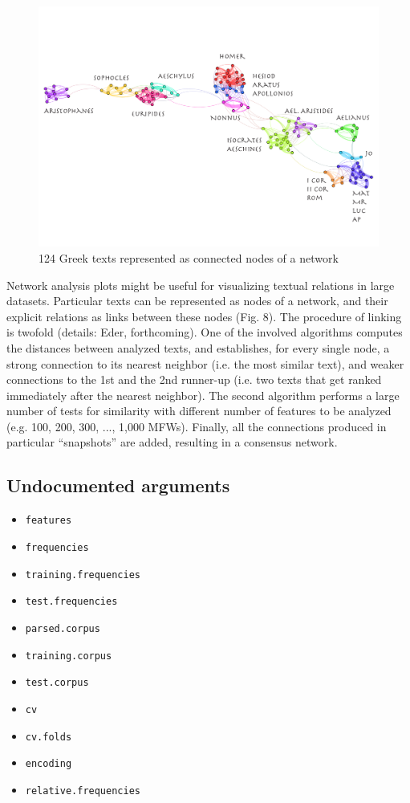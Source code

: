 \documentclass[11pt,a4paper]{article}
\def\code#1{{\tt #1}}
\begin{document}
\begin{figure}
  \centering
  \includegraphics[width=0.8\linewidth]{img/124_Greek_texts.png}
  \caption{124 Greek texts represented as connected nodes of a network}
\end{figure}

Network analysis plots might be useful for visualizing textual relations in large datasets. Particular texts can be represented as nodes of a network, and their explicit relations as links between these nodes (Fig. 8). The procedure of linking is twofold (details: Eder, forthcoming). One of the involved algorithms computes the distances between analyzed texts, and establishes, for every single node, a strong connection to its nearest neighbor (i.e. the most similar text), and weaker connections to the 1st and the 2nd runner-up (i.e. two texts that get ranked immediately after the nearest neighbor). The second algorithm performs a large number of tests for similarity with different number of features to be analyzed (e.g. 100, 200, 300, ..., 1,000 MFWs). Finally, all the connections produced in particular “snapshots” are added, resulting in a consensus network. 





\subsection{Undocumented arguments}

\begin{itemize}

\item \code{features}
\item \code{frequencies}
\item \code{training.frequencies}
\item \code{test.frequencies}
\item \code{parsed.corpus}
\item \code{training.corpus}
\item \code{test.corpus}
\item \code{cv}
\item \code{cv.folds}
\item \code{encoding}
\item \code{relative.frequencies}
\end{itemize}
\end{document}
